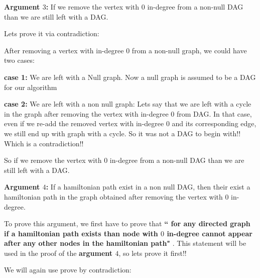 \documentclass[answers]{exam}
\begin{document}
\begin{questions}
\begin{enumerate}
\begin{solution}
\textbf{Argument $3$:} If we remove the vertex with $0$ in-degree from a non-null DAG than we are still left with a DAG.\par

Lets prove it via contradiction:\par
After removing a vertex with in-degree $0$ from a non-null graph, we could have two cases:\par
\textbf{case 1: }We are left with a Null graph. Now a null graph is assumed to be a DAG for our algorithm\par
\textbf{case 2: }We are left with a non null graph: Lets say that we are left with a cycle in the graph after removing the vertex with in-degree $0$ from DAG. In that case, even if we re-add the removed vertex with in-degree $0$ and its corresponding edge, we still end up with graph with a cycle. So it was not a DAG to begin with!! Which is a contradiction!! 

So if we remove the vertex with $0$ in-degree from a non-null DAG than we are still left with a DAG.\par

\textbf{Argument $4$:} If a hamiltonian path exist in a non null DAG, then their exist a hamiltonian path in the graph obtained after removing the vertex with $0$ in-degree. 

To prove this argument, we first have to prove that \textbf{`` for any directed graph if a hamiltonian path exists than node with $0$ in-degree cannot appear after any other nodes in the hamiltonian path" }. This statement will be used in the proof of the \textbf{argument $4$}, so lets prove it first!!\par\par

We will again use prove by contradiction:\par


\end{solution}
\end{enumerate}
\end{questions}
\end{document}
